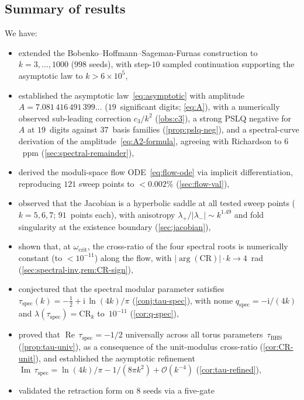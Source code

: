 \documentclass[11pt,a4paper]{article}
\theoremstyle{plain}
\theoremstyle{definition}
\theoremstyle{remark}
\DeclareMathOperator{\Real}{Re}
\DeclareMathOperator{\Imag}{Im}
\newcommand{\ii}{\mathrm{i}}
\newcommand{\abs}[1]{\lvert #1 \rvert}
\newcommand{\Oo}{\mathcal{O}}
\begin{document}
\subsection{Summary of results}
We have:
\begin{itemize}[nosep]
\item extended the Bobenko--Hoffmann--Sageman-Furnas construction to
  $k = 3,\ldots,1000$ ($998$ seeds), with step-$10$ sampled
  continuation supporting the asymptotic law to $k > 6\times 10^5$,
\item established the asymptotic law~\eqref{eq:asymptotic} with
  amplitude $A = 7.081\,416\,491\,399\ldots$ ($19$~significant
  digits; \eqref{eq:A}), with a numerically observed
  sub-leading correction $c_3/k^2$ (\cref{obs:c3}),
  a strong PSLQ negative for~$A$ at $19$~digits against
  $37$~basis families (\cref{prop:pslq-neg}), and a
  spectral-curve derivation of the
  amplitude~\eqref{eq:A2-formula},
  agreeing with Richardson to $6$~ppm (\cref{sec:spectral-remainder}),
\item derived the moduli-space flow ODE~\eqref{eq:flow-ode} via
  implicit differentiation, reproducing $121$ sweep points to
  $< 0.002\%$ (\cref{sec:flow-val}),
\item observed that the Jacobian is a hyperbolic saddle at all
  tested sweep points ($k = 5,6,7$; $91$~points each),
  with anisotropy $\lambda_+/\abs{\lambda_-} \sim k^{1.49}$
  and fold singularity at the existence boundary (\cref{sec:jacobian}),
\item shown that, at $\omega_{\mathrm{crit}}$, the cross-ratio of
  the four spectral roots is numerically constant (to $< 10^{-11}$)
  along the flow, with
  $\lvert\arg(\mathrm{CR})\rvert \cdot k \to 4$~rad
  (\cref{sec:spectral-inv,rem:CR-sign}),
\item conjectured that the spectral modular parameter satisfies
  $\tau_{\mathrm{spec}}(k) = -\tfrac12 + \ii\,\ln(4k)/\pi$
  (\cref{conj:tau-spec}), with nome
  $q_{\mathrm{spec}} = -\ii/(4k)$
  and $\lambda(\tau_{\mathrm{spec}}) = \mathrm{CR}_k$
  to~$10^{-11}$ (\cref{cor:q-spec}),
\item proved that $\Real\,\tau_{\mathrm{spec}} = -1/2$
  universally across all torus parameters~$\tau_{\mathrm{BHS}}$
  (\cref{prop:tau-univ}), as a consequence of the unit-modulus
  cross-ratio (\cref{cor:CR-unit}), and established the
  asymptotic refinement
  $\Imag\,\tau_{\mathrm{spec}} =
  \ln(4k)/\pi - 1/(8\pi k^2) + \Oo(k^{-4})$
  (\cref{cor:tau-refined}),
\item validated the retraction form on $8$ seeds via a five-gate

\end{itemize}
\end{document}
